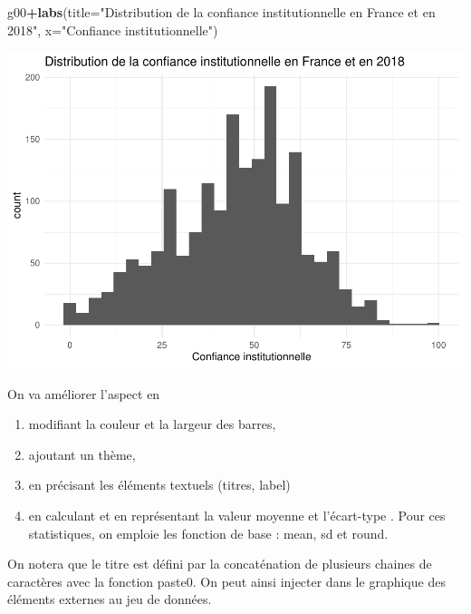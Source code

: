 \documentclass[
]{book}
\newenvironment{Shaded}{\begin{snugshade}}{\end{snugshade}}
\newcommand{\DataTypeTok}[1]{\textcolor[rgb]{0.13,0.29,0.53}{#1}}
\newcommand{\KeywordTok}[1]{\textcolor[rgb]{0.13,0.29,0.53}{\textbf{#1}}}
\newcommand{\NormalTok}[1]{#1}
\newcommand{\OperatorTok}[1]{\textcolor[rgb]{0.81,0.36,0.00}{\textbf{#1}}}
\newcommand{\StringTok}[1]{\textcolor[rgb]{0.31,0.60,0.02}{#1}}
\providecommand{\tightlist}{%
  \setlength{\itemsep}{0pt}\setlength{\parskip}{0pt}}
\begin{document}
\begin{Shaded}
\begin{Highlighting}[]
\NormalTok{g00}\OperatorTok{+}\KeywordTok{labs}\NormalTok{(}\DataTypeTok{title=}\StringTok{"Distribution de la confiance institutionnelle en France et en 2018"}\NormalTok{,}
         \DataTypeTok{x=}\StringTok{"Confiance institutionnelle"}\NormalTok{)}
\end{Highlighting}
\end{Shaded}

\includegraphics{bookdown-demo_files/figure-latex/302-2.pdf}

On va améliorer l'aspect en

\begin{enumerate}
\def\labelenumi{\alph{enumi})}
\tightlist
\item
  modifiant la couleur et la largeur des barres,
\item
  ajoutant un thème,
\item
  en précisant les éléments textuels (titres, label)
\item
  en calculant et en représentant la valeur moyenne et l'écart-type . Pour ces statistiques, on emploie les fonction de base : mean, sd et round.
\end{enumerate}

On notera que le titre est défini par la concaténation de plusieurs chaines de caractères avec la fonction paste0. On peut ainsi injecter dans le graphique des éléments externes au jeu de données.
\end{document}
